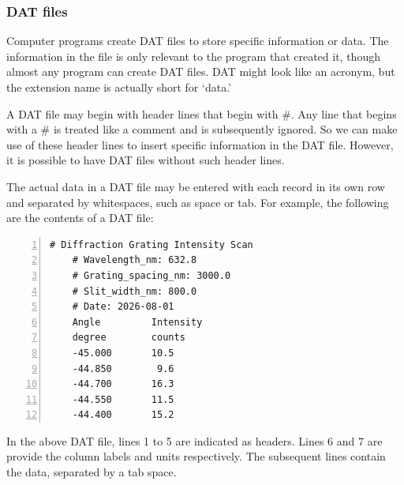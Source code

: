     	\subsubsection{DAT files}
    		Computer programs create DAT files to store specific information or data. The information in the file is only relevant to the program that created it, though almost any program can create DAT files. DAT might look like an acronym, but the extension name is actually short for `data.'
    		
    		A DAT file may begin with header lines that begin with \#. Any line that begins with a \# is treated like a comment and is subsequently ignored. So we can make use of these header lines to insert specific information in the DAT file. However, it is possible to have DAT files without such header lines.
    		
    		The actual data in a DAT file may be entered with each record in its own row and separated by whitespaces, such as space or tab. For example, the following are the contents of a DAT file:
    		\begin{Verbatim}[frame=single, numbers=left]
	# Diffraction Grating Intensity Scan
	# Wavelength_nm: 632.8
	# Grating_spacing_nm: 3000.0
	# Slit_width_nm: 800.0
	# Date: 2026-08-01
	Angle         Intensity
	degree        counts
	-45.000       10.5
	-44.850        9.6
	-44.700       16.3
	-44.550       11.5
	-44.400       15.2
    		\end{Verbatim}
    		
    		In the above DAT file, lines 1 to 5 are indicated as headers. Lines 6 and 7 are provide the column labels and units respectively. The subsequent lines contain the data, separated by a tab space.
    		
